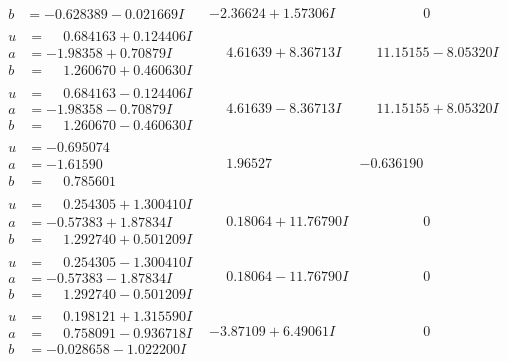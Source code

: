 \documentclass[1p]{elsarticle_modified}
\theoremstyle{definition}
\begin{document}
$$\begin{array}{c|c|c}
\begin{aligned}
b &= -0.628389 - 0.021669 I\end{aligned}
 & -2.36624 + 1.57306 I & \phantom{-0.000000 } 0 \\ \hline\begin{aligned}
u &= \phantom{-}0.684163 + 0.124406 I \\
a &= -1.98358 + 0.70879 I \\
b &= \phantom{-}1.260670 + 0.460630 I\end{aligned}
 & \phantom{-}4.61639 + 8.36713 I & \phantom{-}11.15155 - 8.05320 I \\ \hline\begin{aligned}
u &= \phantom{-}0.684163 - 0.124406 I \\
a &= -1.98358 - 0.70879 I \\
b &= \phantom{-}1.260670 - 0.460630 I\end{aligned}
 & \phantom{-}4.61639 - 8.36713 I & \phantom{-}11.15155 + 8.05320 I \\ \hline\begin{aligned}
u &= -0.695074\phantom{ +0.000000I} \\
a &= -1.61590\phantom{ +0.000000I} \\
b &= \phantom{-}0.785601\phantom{ +0.000000I}\end{aligned}
 & \phantom{-}1.96527\phantom{ +0.000000I} & -0.636190\phantom{ +0.000000I} \\ \hline\begin{aligned}
u &= \phantom{-}0.254305 + 1.300410 I \\
a &= -0.57383 + 1.87834 I \\
b &= \phantom{-}1.292740 + 0.501209 I\end{aligned}
 & \phantom{-}0.18064 + 11.76790 I & \phantom{-0.000000 } 0 \\ \hline\begin{aligned}
u &= \phantom{-}0.254305 - 1.300410 I \\
a &= -0.57383 - 1.87834 I \\
b &= \phantom{-}1.292740 - 0.501209 I\end{aligned}
 & \phantom{-}0.18064 - 11.76790 I & \phantom{-0.000000 } 0 \\ \hline\begin{aligned}
u &= \phantom{-}0.198121 + 1.315590 I \\
a &= \phantom{-}0.758091 - 0.936718 I \\
b &= -0.028658 - 1.022200 I\end{aligned}
 & -3.87109 + 6.49061 I & \phantom{-0.000000 } 0\\

\end{array}$$
\end{document}
